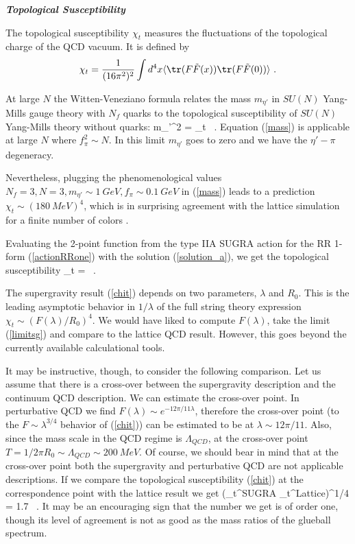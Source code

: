 \medskip

{\it\bf Topological Susceptibility}

The topological susceptibility $\chi_t$ measures the fluctuations of the
topological charge of the QCD vacuum. 
It is defined by
\begin{equation}
\chi_t=\frac{1}{(16\pi^2)^2} \int d^4x \langle \tr(F\tilde{F}(x))
  \tr(F\tilde{F}(0))\rangle \ .
  \label{topol}
\end{equation}
  
At large $N$ the Witten-Veneziano formula \cite{Witten:1979ca,
Veneziano:1979uv} relates the mass $m_{\eta'}$ in $SU(N)$ Yang-Mills
gauge theory with $N_f$ quarks to the topological susceptibility of
$SU(N)$ Yang-Mills theory without quarks:
\beq m_{\eta'}^2 =  \chi_t \ .
\label{mass}
\eeq
Equation (\ref{mass})
is applicable at large $N$ where $f_{\pi}^2 \sim N$. In this limit
$m_{\eta'}$ goes to zero and we have the $\eta'-\pi$ degeneracy.

Nevertheless, plugging the phenomenological values $N_f=3, N=3,
m_{\eta'}\sim 1~ GeV,f_{\pi} \sim 0.1~ GeV$ in (\ref{mass}) leads to a
prediction $\chi_t \sim (180~ MeV)^4$, which is in surprising
agreement with the lattice simulation for a finite number of colors
\cite{Teper:1997pf}.

Evaluating the 2-point function from the type IIA SUGRA 
action for the RR 1-form
(\ref{actionRRone}) with the solution (\ref{solution_a}), we get the topological
susceptibility
\beq
\chi_t =  \ .
\label{chit}
\eeq


The supergravity result (\ref{chit})
 depends on two parameters, $\lambda$ and
$R_0$. This is the leading  asymptotic
behavior in $1/\lambda$ of the full string theory expression 
$\chi_t \sim (F(\lambda) / R_0)^4$.
We would have liked to compute $F(\lambda)$, take the limit (\ref{limitsg})
and compare to the lattice QCD result.
However, this goes beyond the currently available calculational tools. 

It may be instructive, though, to consider the following comparison.
Let us assume that there is a cross-over between the supergravity
description and the continuum QCD description. We can estimate the
cross-over point.  In perturbative QCD we find $F(\lambda) \sim e^{-12 \pi/
11 \lambda}$, therefore the cross-over point (to the $F \sim
\lambda^{3/4}$ behavior of (\ref{chit})) can be estimated to be at
$\lambda \sim 12\pi/11$.  Also, since the mass scale in the
QCD regime is $\Lambda_{QCD}$, at the cross-over point $T = 1/2 \pi R_0 \sim
\Lambda_{QCD}\sim 200~ MeV$.  Of course, we should bear in mind that
at the cross-over point both the supergravity and perturbative QCD are
not applicable descriptions.  If we compare the topological
susceptibility (\ref{chit}) at the correspondence point with the
lattice result we get
\beq
\left({\chi_t^{{\rm SUGRA}}  \over 
\chi_t^{{\rm Lattice}}}\right)^{1/4} =  1.7 \ .
\eeq
It may be an encouraging sign that the number we get is of order one,
though its level of agreement is not as good as the mass ratios of the
glueball spectrum.

